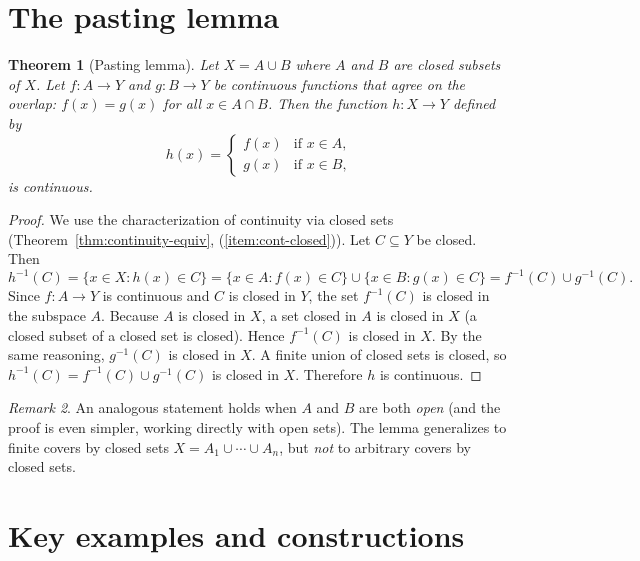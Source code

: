 \documentclass[11pt,a4paper,twoside]{book}
\newtheorem{theorem}{Theorem}[section]
\theoremstyle{remark}
\newtheorem{remark}[theorem]{Remark}
\theoremstyle{definition}
\theoremstyle{definition}
\begin{document}
\section{The pasting lemma}
\label{sec:pasting-lemma}

\begin{theorem}[Pasting lemma]
\label{thm:pasting-lemma}
Let $X=A\cup B$ where $A$ and $B$ are closed subsets of $X$.  Let
$f\colon A\to Y$ and $g\colon B\to Y$ be continuous functions that agree on
the overlap: $f(x)=g(x)$ for all $x\in A\cap B$.  Then the function
$h\colon X\to Y$ defined by
\[
    h(x)=
    \begin{cases}
        f(x) & \text{if } x\in A,\\
        g(x) & \text{if } x\in B,
    \end{cases}
\]
is continuous.
\end{theorem}

\begin{proof}
We use the characterization of continuity via closed sets
(Theorem~\ref{thm:continuity-equiv}, (\ref{item:cont-closed})).  Let
$C\subseteq Y$ be closed.  Then
\[
    h^{-1}(C)
    = \{x\in X : h(x)\in C\}
    = \{x\in A : f(x)\in C\}\cup\{x\in B : g(x)\in C\}
    = f^{-1}(C)\cup g^{-1}(C).
\]
Since $f\colon A\to Y$ is continuous and $C$ is closed in $Y$, the set
$f^{-1}(C)$ is closed in the subspace $A$.  Because $A$ is closed in $X$, a
set closed in $A$ is closed in $X$ (a closed subset of a closed set is
closed).  Hence $f^{-1}(C)$ is closed in $X$.  By the same reasoning,
$g^{-1}(C)$ is closed in $X$.  A finite union of closed sets is closed, so
$h^{-1}(C)=f^{-1}(C)\cup g^{-1}(C)$ is closed in $X$.  Therefore $h$ is
continuous.
\end{proof}

\begin{remark}
\label{rem:pasting-open}
An analogous statement holds when $A$ and $B$ are both \emph{open} (and the
proof is even simpler, working directly with open sets).  The lemma generalizes
to finite covers by closed sets $X=A_1\cup\cdots\cup A_n$, but \emph{not} to
arbitrary covers by closed sets.
\end{remark}

\section{Key examples and constructions}
\label{sec:continuity-examples}
\end{document}
